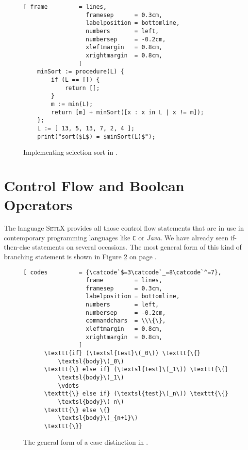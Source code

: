 \begin{figure}[!ht]
\centering
\begin{Verbatim}[ frame         = lines, 
                  framesep      = 0.3cm, 
                  labelposition = bottomline,
                  numbers       = left,
                  numbersep     = -0.2cm,
                  xleftmargin   = 0.8cm,
                  xrightmargin  = 0.8cm,
                ]
    minSort := procedure(L) {
        if (L == []) {
            return [];
        }
        m := min(L);
        return [m] + minSort([x : x in L | x != m]);
    };   
    L := [ 13, 5, 13, 7, 2, 4 ];
    print("sort($L$) = $minSort(L)$");
\end{Verbatim}
\vspace*{-0.3cm}
\caption{Implementing selection sort in \setlx.}
\label{fig:min-sort.stlx}
\end{figure}

\section{Control Flow and Boolean Operators}
The language \textsc{SetlX} provides all those control flow statements that are in use in
contemporary programming languages like \texttt{C} or \textsl{Java}.  We have already seen if-then-else
statements on several occasions.  The most general form of this kind of branching statement is shown
in Figure \ref{fig:if} on page \pageref{fig:if}.
\begin{figure}[!ht]
\begin{Verbatim}[ codes         = {\catcode`$=3\catcode`_=8\catcode`^=7},
                  frame         = lines, 
                  framesep      = 0.3cm, 
                  labelposition = bottomline,
                  numbers       = left,
                  numbersep     = -0.2cm,
                  commandchars  = \\\{\},
                  xleftmargin   = 0.8cm,
                  xrightmargin  = 0.8cm,
                ]
      \texttt{if} (\textsl{test}\(_0\)) \texttt{\{}
          \textsl{body}\(_0\)
      \texttt{\} else if} (\textsl{test}\(_1\)) \texttt{\{}
          \textsl{body}\(_1\)
          \vdots
      \texttt{\} else if} (\textsl{test}\(_n\)) \texttt{\{}
          \textsl{body}\(_n\)
      \texttt{\} else \{}
          \textsl{body}\(_{n+1}\)
      \texttt{\}}
\end{Verbatim} 
\vspace*{-0.3cm}
\caption{The general form of a case distinction in \setlx.}  
\label{fig:if}
\end{figure}%


